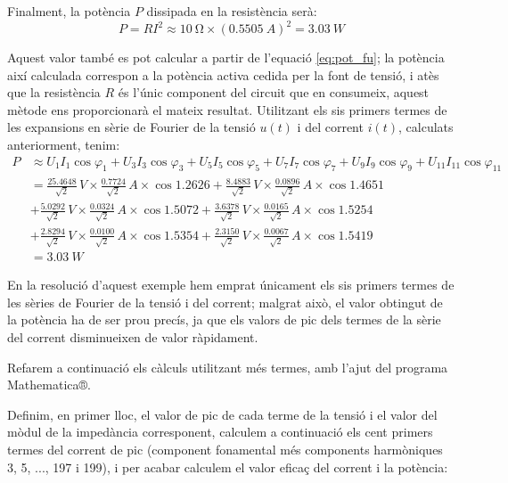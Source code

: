 \begin{exemple}
    Finalment, la potència $P$ dissipada en la resistència serà:
    \[
        P = R I^2 \approx \qty{10}{\ohm} \times (\qty{0,5505}{A})^2 =
        \qty{3,03}{W}
    \]

    Aquest valor també es pot calcular a partir de l'equació
    \eqref{eq:pot_fu}; la potència així calculada correspon a la
    potència activa cedida per la font de tensió, i atès que la
    resistència $R$ és l'únic component del circuit que en consumeix,
    aquest mètode ens proporcionarà el mateix resultat. Utilitzant els sis primers termes  de les
    expansions en sèrie de Fourier de la tensió $u(t)$ i del corrent
    $i(t)$, calculats anteriorment, tenim:
    \[\begin{split}
        P &\approx U_1 I_1 \cos\varphi_1 +  U_3 I_3 \cos\varphi_3 +
         U_5 I_5 \cos\varphi_5 + U_7 I_7 \cos\varphi_7 +
         U_9 I_9 \cos\varphi_9 + U_{11} I_{11} \cos\varphi_{11} \\[0.7ex]
        &= \frac{\num{25,4648}}{\sqrt{2}}\unit{\,V} \times
        \frac{\num{0,7724}}{\sqrt{2}}\unit{\,A} \times \cos \num{1,2626} +
        \frac{\num{8,4883}}{\sqrt{2}}\unit{\,V} \times
        \frac{\num{0,0896}}{\sqrt{2}}\unit{\,A} \times \cos \num{1,4651}  \\[0.7ex]
        &+ \frac{\num{5,0292}}{\sqrt{2}}\unit{\,V} \times
        \frac{\num{0,0324}}{\sqrt{2}}\unit{\,A} \times \cos \num{1,5072} +
        \frac{\num{3,6378}}{\sqrt{2}}\unit{\,V} \times
        \frac{\num{0,0165}}{\sqrt{2}}\unit{\,A} \times \cos \num{1,5254} \\[0.7ex]
        &+ \frac{\num{2,8294}}{\sqrt{2}}\unit{\,V} \times
        \frac{\num{0,0100}}{\sqrt{2}}\unit{\,A} \times \cos \num{1,5354} +
        \frac{\num{2,3150}}{\sqrt{2}}\unit{\,V} \times
        \frac{\num{0,0067}}{\sqrt{2}}\unit{\,A} \times \cos \num{1,5419}\\[0.7ex]
        &= \qty{3,03}{W}
    \end{split}\]

    En la resolució d'aquest exemple hem emprat únicament els sis
    primers termes de les sèries de Fourier de la tensió i del corrent;
    malgrat això, el valor  obtingut de la potència ha de ser prou precís, ja que
    els valors de pic dels termes de la sèrie del corrent disminueixen de
    valor ràpidament.

    Refarem a continuació els càlculs utilitzant més termes, amb l'ajut
    del programa
    Mathematica®.   

    Definim, en primer lloc, el valor de pic de cada
     terme de la tensió i el valor del mòdul de la impedància corresponent,
    calculem a continuació els cent primers termes  del corrent de pic (component fonamental més components harmòniques 3, 5, ..., 197 i 199), i
    per acabar calculem el valor eficaç del corrent i la potència:


\end{exemple}

